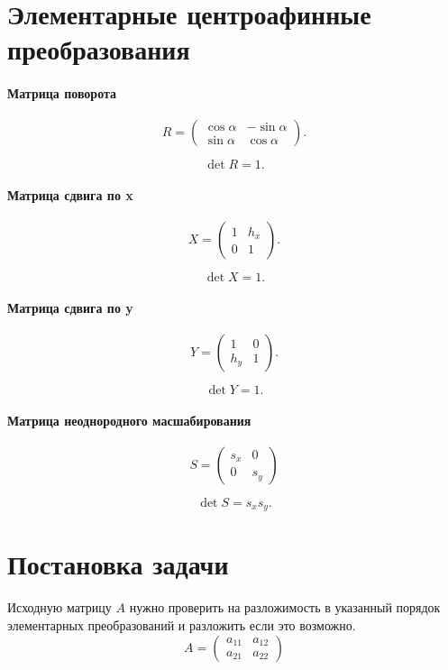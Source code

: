 \section{Элементарные центроафинные преобразования}

\paragraph{Матрица поворота}

$$R = \begin{pmatrix}
	\cos\alpha & -\sin\alpha \\
	\sin\alpha & \cos\alpha
\end{pmatrix}.
$$

$$\det R = 1.$$

\paragraph{Матрица сдвига по x}
$$
X = \begin{pmatrix}
	1 & h_x \\
	0 & 1
\end{pmatrix}.
$$

$$\det X = 1.$$

\paragraph{Матрица сдвига по y}
$$
Y = \begin{pmatrix}
	1 & 0 \\
	h_y & 1
\end{pmatrix}.
$$

$$\det Y = 1.$$

\paragraph{Матрица неоднородного масшабирования}
$$S=
\begin{pmatrix}
	s_x & 0 \\
	0 & s_y
\end{pmatrix}
$$

$$\det S = s_x s_y.$$

\section{Постановка задачи}

Исходную матрицу $A$ нужно проверить на разложимость в указанный порядок элементарных преобразований и разложить если это возможно.
$$A = 
\begin{pmatrix}
	a_{11} & a_{12}\\
	a_{21} & a_{22}
\end{pmatrix}
$$

